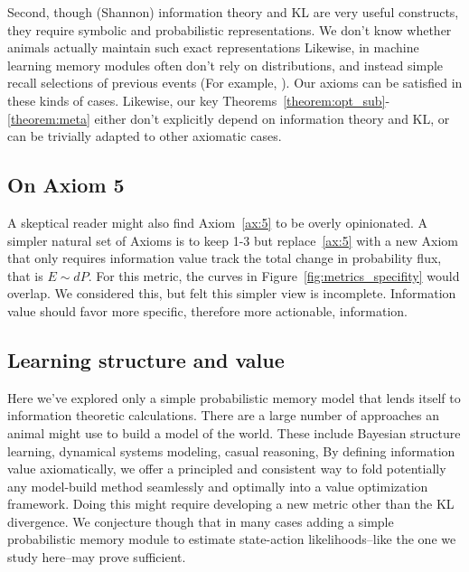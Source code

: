 \documentclass[9pt,twocolumn,twoside]{pnas-new}
\begin{document}
Second, though (Shannon) information theory and KL are very useful constructs, they require symbolic and probabilistic representations. We don't know whether animals actually maintain such exact representations %
Likewise, in machine learning memory modules often don't rely on distributions, and instead simple recall selections of previous events (For example, \cite{Min2016}). 
Our axioms can be satisfied in these kinds of cases. Likewise, our key Theorems~\ref{theorem:opt_sub}-\ref{theorem:meta} either don't explicitly depend on information theory and KL, or can be trivially adapted to other axiomatic cases.

\subsection*{On Axiom 5} 
A skeptical reader might also find Axiom~\ref{ax:5} to be overly opinionated. A simpler natural set of Axioms is to keep 1-3 but replace~\ref{ax:5} with a new Axiom  that only requires information value track the total change in probability flux, that is $E \sim dP$. For this metric, the curves in Figure~\ref{fig:metrics_specifity} would overlap. We considered this, but felt this simpler view is incomplete. Information value should favor more specific, therefore more actionable, information. 


\subsection*{Learning structure and value}
Here we've explored only a simple probabilistic memory model that lends itself to information theoretic calculations. There are a large number of approaches an animal might use to build a model of the world. These include Bayesian structure learning, dynamical systems modeling, casual reasoning, %
By defining information value axiomatically, we offer a principled and consistent way to fold potentially any model-build method seamlessly and optimally into a value optimization framework. Doing this might require developing a new metric other than the KL divergence. We conjecture though that in many cases adding a simple probabilistic memory module to estimate state-action likelihoods--like the one we study here--may prove sufficient.


\end{document}
